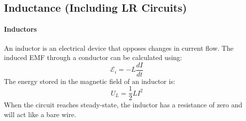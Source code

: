 \documentclass{article}
\begin{document}
        \subsection{Inductance (Including LR Circuits)}
            \paragraph{Inductors}
            An inductor is an electrical device that opposes changes in current flow. The induced EMF through a conductor can be calculated using:
            \begin{equation}
                \mathcal{E}_i = - L \frac{dI}{dt}
            \end{equation}
            The energy stored in the magnetic field of an inductor is:
            \begin{equation}
                U_L = \frac{1}{2} L I^2
            \end{equation}
            When the circuit reaches steady-state, the inductor has a resistance of zero and will act like a bare wire.
\end{document}
